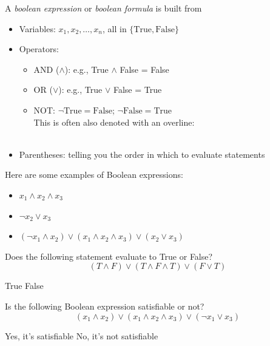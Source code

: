 \documentclass[11  pt]{article}
\begin{document}
	A \emph{boolean expression} or \emph{boolean formula} is built from 
	\begin{itemize}
		\item Variables: $x_1, x_2, \hdots , x_n$, all in $\{\text{True}, \text{False}\}$ \\
		\item Operators: 
		\begin{itemize}
			\item AND ($\land$): e.g., True $\land$ False = False\\
			\vs{1cm}
			
			
			\item OR ($\lor$):  e.g., True $\lor$ False = True \\
						\vs{1cm}
			\item NOT: $\neg \text{True} = \text{False}$; $\neg \text{False} = \text{True}$ \\
			
			This is often also denoted with an overline: \\ \\%
		\end{itemize}
		\item Parentheses: telling you the order in which to evaluate statements
	\end{itemize}
	\vfill
	
	Here are some examples of Boolean expressions:
	\begin{itemize}
		\item $x_1 \land x_2 \land x_3$
		\item $\neg x_2 \lor x_3$
		\item $(\neg x_1 \land x_2) \lor (x_1 \land x_2 \land x_3) \lor (x_2 \lor x_3)$
	\end{itemize}
	\vfill
	\newpage
	
	\begin{Qu}
		Does the following statement evaluate to True or False?
		$$(T \land F) \lor (T \land F \land T) \lor (F \lor T)$$
		\begin{itemize}
			\aitem True
			\bitem False
		\end{itemize}
	\end{Qu}
	\vfill
	\begin{Qu}
		Is the following Boolean expression satisfiable or not?
		$$(x_1 \land x_2) \lor (x_1 \land x_2 \land x_3) \lor (\neg x_1 \lor x_3)$$
		\begin{itemize}
			\aitem Yes, it's satisfiable
			\bitem No, it's not satisfiable
		\end{itemize}
	\end{Qu}
\vfill
	\newpage
	
\end{document}
